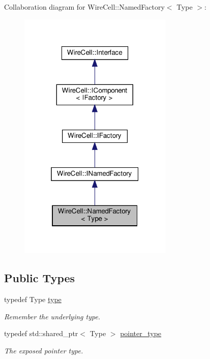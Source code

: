 Collaboration diagram for Wire\+Cell\+:\+:Named\+Factory$<$ Type $>$\+:
\nopagebreak
\begin{figure}[H]
\begin{center}
\leavevmode
\includegraphics[width=208pt]{class_wire_cell_1_1_named_factory__coll__graph}
\end{center}
\end{figure}
\subsection*{Public Types}
\begin{DoxyCompactItemize}
\item 
typedef Type \hyperlink{class_wire_cell_1_1_named_factory_ace1be935e0fdfcf97cba250e9b7ebfcf}{type}
\begin{DoxyCompactList}\small\item\em Remember the underlying type. \end{DoxyCompactList}\item 
typedef std\+::shared\+\_\+ptr$<$ Type $>$ \hyperlink{class_wire_cell_1_1_named_factory_a643f13362219cca5a653ee3c294273ef}{pointer\+\_\+type}
\begin{DoxyCompactList}\small\item\em The exposed pointer type. \end{DoxyCompactList}\end{DoxyCompactItemize}
